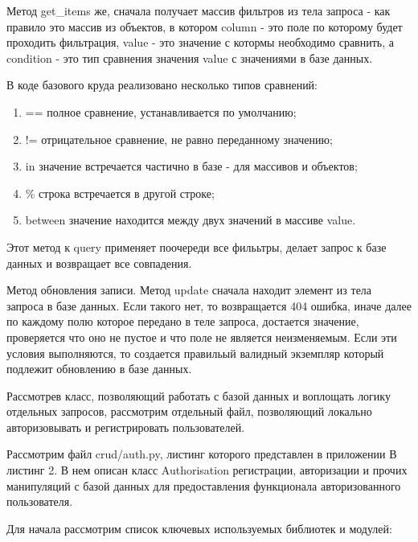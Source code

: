\documentclass[a4paper,14pt,oneside]{extreport}
\begin{document}
Метод get\_items же, сначала получает массив фильтров из тела запроса - как правило это массив из объектов, в котором column - это поле по которому будет проходить фильтрация, value - это значение с котормы необходимо сравнить, а condition - это тип сравнения значения value с значениями в базе данных.

В коде базового круда реализовано несколько типов сравнений:

\begin{enumerate}[label=\arabic*)]
    \item == полное сравнение, устанавливается по умолчанию;
    \item != отрицательное сравнение, не равно переданному значению;
    \item in значение встречается частично в базе - для массивов и объектов;
    \item \% строка встречается в другой строке;
    \item between значение находится между двух значений в массиве value.
\end{enumerate}

Этот метод к query применяет поочереди все филььтры, делает запрос к базе данных и возвращает все совпадения.

Метод обновления записи. Метод update сначала находит элемент из тела запроса в базе данных. Если такого нет, то возвращается 404 ошибка, иначе далее по каждому полю которое передано в теле запроса, достается значение, проверяется что оно не пустое и что поле не является неизменяемым. Если эти условия выполняются, то создается правильый валидный экземпляр который подлежит обновлению в базе данных.

Рассмотрев класс, позволяющий работать с базой данных и воплощать логику отдельных запросов, рассмотрим отдельный файл, позволяющий локально авторизовывать и регистрировать пользователей.

Рассмотрим файл crud/auth.py, листинг которого представлен в приложении В листинг 2.  В нем описан класс Authorisation регистрации, авторизации и прочих манипуляций с базой данных для предоставления функционала авторизованного пользователя. 

Для начала рассмотрим список ключевых используемых библиотек и модулей:
\end{document}
